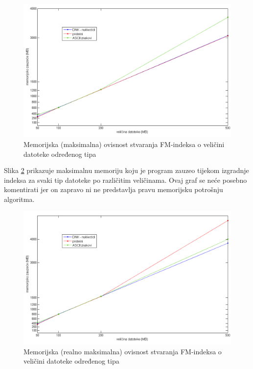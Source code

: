 \begin{figure}[H]
   \centering
       \includegraphics[width=\textwidth]{./pictures/test_mem_pravo.png}
 \caption{Memorijska (maksimalna) ovisnost stvaranja FM-indeksa o veličini datoteke određenog tipa}
 \label{fig:test_mem_pravo}
\end{figure}

Slika \ref{fig:test_mem_max} prikazuje maksimalnu memoriju koju je program zauzeo tijekom izgradnje indeksa za svaki tip datoteke po različitim veličinama. Ovaj graf se neće posebno komentirati jer on zapravo ni ne predstavlja pravu memorijsku potrošnju algoritma.


\begin{figure}[H]
   \centering
       \includegraphics[width=\textwidth]{./pictures/test_mem_max.png}
 \caption{Memorijska (realno maksimalna) ovisnost stvaranja FM-indeksa o veličini datoteke određenog tipa}
 \label{fig:test_mem_max}
\end{figure}

